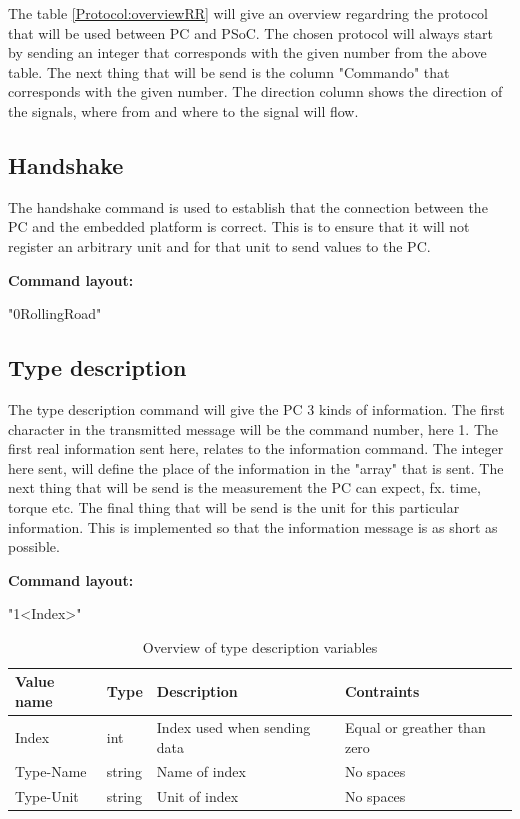 The table \ref{Protocol:overviewRR} will give an overview regardring the protocol that will be used between PC and PSoC. The chosen protocol will always start by sending an integer that corresponds with the given number from the above table.  The next thing that will be send is the column "Commando" that corresponds with the given number. The direction column shows the direction of the signals, where from and where to the signal will flow.

\subsection{Handshake}
The handshake command is used to establish that the connection between the PC and the embedded platform is correct. This is to ensure that it will not register an arbitrary unit and for that unit to send values to the PC.  

\textbf{Command layout:}

"0\textvisiblespace RollingRoad"

\subsection{Type description}
The type description command will give the PC 3 kinds of information. The first character in the transmitted message will be the command number, here 1. The first real information sent here, relates to the information command. The integer here sent, will define the place of the information in the "array" that is sent. The next thing that will be send is the measurement the PC can expect, fx. time, torque etc. The final thing that will be send is the unit for this particular information. This is implemented so that the information message is as short as possible.

\textbf{Command layout:}

"1\textvisiblespace <Index>"

\begin{table}[h!]
	\centering
	\label{Protocol:SP4RR_TypeDescVars}
	\begin{tabular}{llll}
		Value name 	& Type 		& Description 					& Contraints  					\\\hline
		Index  		& int   	& Index used when sending data 	& Equal or greather than zero	\\
		Type-Name  	& string 	& Name of index 				& No spaces						\\
		Type-Unit  	& string	& Unit of index					& No spaces 					\\
	\end{tabular}
	\caption{Overview of type description variables}
\end{table}


